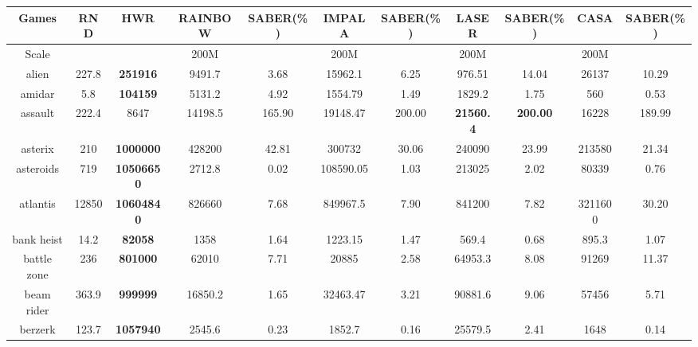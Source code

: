 \tiny
\begin{center}
\begin{tabular}{ccccccccccc}
\toprule
Games & RND & HWR & RAINBOW & SABER(\%) & IMPALA & SABER(\%) & LASER & SABER(\%) & CASA & SABER(\%) \\
\midrule
Scale  &     &       & 200M   &       &  200M    &        & 200M   & &  200M   &  \\
\midrule
 alien              & 227.8     & \textbf{251916}    & 9491.7   &3.68    & 15962.1    & 6.25       & 976.51  & 14.04                                & 26137             & 10.29    \\
 amidar             & 5.8       & \textbf{104159}    & 5131.2   &4.92    & 1554.79    & 1.49       & 1829.2  & 1.75                                 & 560             & 0.53            \\
 assault            & 222.4     & 8647               & 14198.5  &165.90  & 19148.47   & 200.00     & \textbf{21560.4} & \textbf{200.00}                               & 16228             & 189.99   \\
 asterix            & 210       & \textbf{1000000}   & 428200   &42.81   & 300732     & 30.06      & 240090  & 23.99                                & 213580            & 21.34  \\
 asteroids          & 719       & \textbf{10506650}  & 2712.8   &0.02    & 108590.05  & 1.03       & 213025  & 2.02                                 & 80339            & 0.76   \\
 atlantis           & 12850     & \textbf{10604840}  & 826660   &7.68    & 849967.5   & 7.90       & 841200  & 7.82                                 & 3211600               & 30.20   \\
 bank heist         & 14.2      & \textbf{82058}     & 1358     &1.64    & 1223.15    & 1.47       & 569.4   & 0.68                                 & 895.3             & 1.07 \\
 battle zone        & 236       &\textbf{801000}    & 62010    &7.71    & 20885      & 2.58       & 64953.3 & 8.08                                           & 91269            & 11.37  \\
 beam rider         & 363.9     & \textbf{999999}    & 16850.2  &1.65    & 32463.47   & 3.21       & 90881.6 & 9.06                                 & 57456           & 5.71    \\
 berzerk            & 123.7     & \textbf{1057940}            & 2545.6   &0.23    & 1852.7     & 0.16       & 25579.5 & 2.41                        & 1648             & 0.14        \\

\end{tabular}
\end{center}
